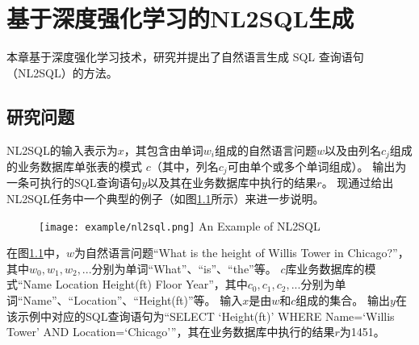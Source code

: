 
\chapter{基于深度强化学习的NL2SQL生成}
\label{chap:enl2sql}
本章基于深度强化学习技术，研究并提出了自然语言生成 SQL 查询语句（NL2SQL）的方法。

\section{研究问题}


NL2SQL的输入表示为$x$，其包含由单词$w_{i}$组成的自然语言问题$w$以及由列名$c_{j}$组成的业务数据库单张表的模式 $c$（其中，列名$c_{j}$可由单个或多个单词组成）。
输出为一条可执行的SQL查询语句$y$以及其在业务数据库中执行的结果$r$。
现通过给出NL2SQL任务中一个典型的例子（如图\ref{fig:nl2sqlexample}所示）来进一步说明。

\begin{figure}[!htp]
    \centering
    \texttt{[image: example/nl2sql.png]}
      {An Example of NL2SQL}
    \label{fig:nl2sqlexample}
  \end{figure}

在图\ref{fig:nl2sqlexample}中，$w$为自然语言问题“What is  the height of Willis Tower in Chicago?”，其中$w_0,w_1,w_2,...$分别为单词“What”、“is”、“the”等。
$c$库业务数据库的模式“Name Location Height(ft) Floor Year”，其中$c_0,c_1,c_2,...$分别为单词“Name”、“Location”、“Height(ft)”等。
输入$x$是由$w$和$c$组成的集合。
输出$y$在该示例中对应的SQL查询语句为“SELECT ‘Height(ft)’ WHERE Name=‘Willis Tower’ AND Location=‘Chicago’”，其在业务数据库中执行的结果$r$为1451。

